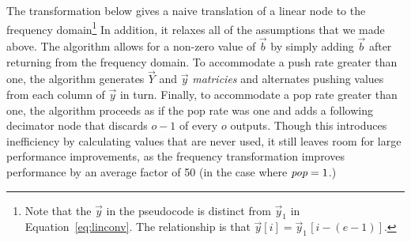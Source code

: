 The transformation below gives a naive translation of a linear node to
the frequency domain\footnote{Note that the $\vec{y}$ in the
pseudocode is distinct from $\vec{y}_1$ in Equation~\ref{eq:linconv}.
The relationship is that $\vec{y}[i] = \vec{y}_1\hspace{1pt}[i-(e-1)]$.}  In
addition, it relaxes all of the assumptions that we made above.  The
algorithm allows for a non-zero value of ${\vec b}$ by simply adding
$\vec{b}$ after returning from the frequency domain.  To accommodate
a push rate greater than one, the algorithm generates $\vec{Y}$ and 
$\vec{y}$ {\it matricies} and alternates pushing values from each column 
of $\vec{y}$ in turn.
Finally, to accommodate a pop rate greater than one, the algorithm
proceeds as if the pop rate was one and adds a following decimator node 
that discards $o-1$ of every $o$ outputs. 
Though this introduces inefficiency by calculating values that are
never used, it still leaves room for large performance improvements, 
as the frequency transformation improves performance by an average factor 
of 50 (in the case where $\mbox{\it pop}=1$.)

